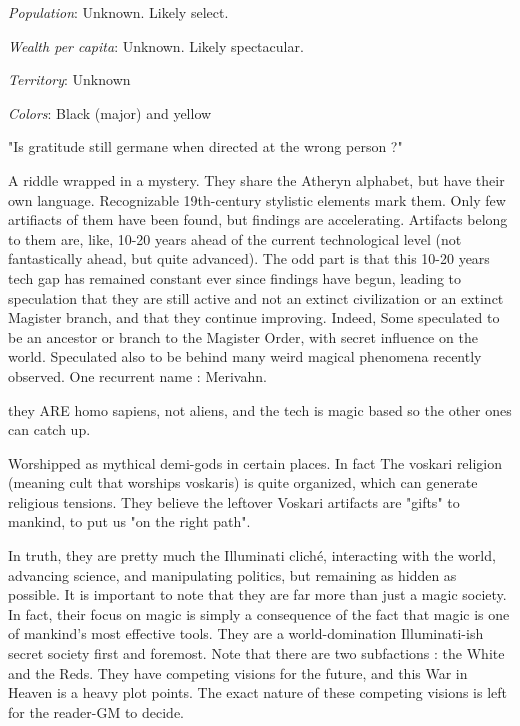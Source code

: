 \textit{Population}: Unknown. Likely select.

\textit{Wealth per capita}: Unknown. Likely spectacular.

\textit{Territory}: Unknown
    
\textit{Colors}: Black (major) and yellow






\begin{rpg-quotebox}
	"Is gratitude still germane when directed at the wrong person ?"
\end{rpg-quotebox}

A riddle wrapped in a mystery. They share the Atheryn alphabet, but have their own language. Recognizable 19th-century stylistic elements mark them. Only few artifiacts of them have been found, but findings are accelerating. Artifacts belong to them are, like, 10-20 years ahead of the current technological level (not fantastically ahead, but quite advanced). The odd part is that this 10-20 years tech gap has remained constant ever since findings have begun, leading to speculation that they are still active and not an extinct civilization or an extinct Magister branch, and that they continue improving. Indeed, Some speculated to be an ancestor or branch to the Magister Order, with secret influence on the world. Speculated also to be behind many weird magical phenomena recently observed. One recurrent name : Merivahn.

they ARE homo sapiens, not aliens, and the tech is magic based so the other ones can catch up.
	
Worshipped as mythical demi-gods in certain places. In fact The voskari religion (meaning cult that worships voskaris) is quite organized, which can generate religious tensions. They believe the leftover Voskari artifacts are "gifts" to mankind, to put us "on the right path". 

In truth, they are pretty much the Illuminati cliché, interacting with the world, advancing science, and manipulating politics, but remaining as hidden as possible. It is important to note that they are far more than just a magic society. In fact, their focus on magic is simply a consequence of the fact that magic is one of mankind's most effective tools. They are a world-domination Illuminati-ish secret society first and foremost.
    Note that there are two subfactions : the White and the Reds. They have competing visions for the future, and this War in Heaven is a heavy plot points. The exact nature of these competing visions is left for the reader-GM to decide.


